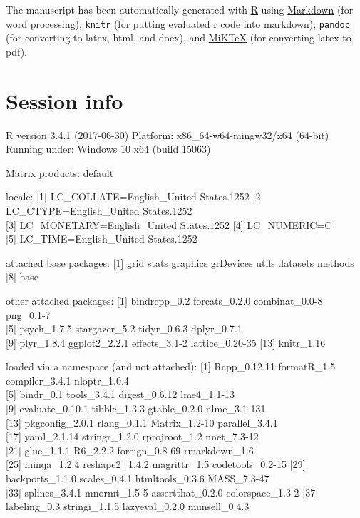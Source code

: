 \documentclass[11pt,,]{article}
\begin{document}
The manuscript has been automatically generated with
\href{http://r-project.org/}{R} using
\href{http://daringfireball.net/projects/markdown/}{Markdown} (for word
processing), \href{http://yihui.name/knitr/}{\texttt{knitr}} (for
putting evaluated r code into markdown),
\href{http://johnmacfarlane.net/pandoc/}{\texttt{pandoc}} (for
converting to latex, html, and docx), and
\href{http://miktex.org/}{MiKTeX} (for converting latex to pdf).

\newpage

\section{Session info}\label{session-info}

R version 3.4.1 (2017-06-30) Platform: x86\_64-w64-mingw32/x64 (64-bit)
Running under: Windows 10 x64 (build 15063)

Matrix products: default

locale: {[}1{]} LC\_COLLATE=English\_United States.1252 {[}2{]}
LC\_CTYPE=English\_United States.1252\\
{[}3{]} LC\_MONETARY=English\_United States.1252 {[}4{]} LC\_NUMERIC=C\\
{[}5{]} LC\_TIME=English\_United States.1252

attached base packages: {[}1{]} grid stats graphics grDevices utils
datasets methods\\
{[}8{]} base

other attached packages: {[}1{]} bindrcpp\_0.2 forcats\_0.2.0
combinat\_0.0-8 png\_0.1-7\\
{[}5{]} psych\_1.7.5 stargazer\_5.2 tidyr\_0.6.3 dplyr\_0.7.1\\
{[}9{]} plyr\_1.8.4 ggplot2\_2.2.1 effects\_3.1-2 lattice\_0.20-35
{[}13{]} knitr\_1.16

loaded via a namespace (and not attached): {[}1{]} Rcpp\_0.12.11
formatR\_1.5 compiler\_3.4.1 nloptr\_1.0.4\\
{[}5{]} bindr\_0.1 tools\_3.4.1 digest\_0.6.12 lme4\_1.1-13\\
{[}9{]} evaluate\_0.10.1 tibble\_1.3.3 gtable\_0.2.0 nlme\_3.1-131\\
{[}13{]} pkgconfig\_2.0.1 rlang\_0.1.1 Matrix\_1.2-10 parallel\_3.4.1\\
{[}17{]} yaml\_2.1.14 stringr\_1.2.0 rprojroot\_1.2 nnet\_7.3-12\\
{[}21{]} glue\_1.1.1 R6\_2.2.2 foreign\_0.8-69 rmarkdown\_1.6\\
{[}25{]} minqa\_1.2.4 reshape2\_1.4.2 magrittr\_1.5 codetools\_0.2-15
{[}29{]} backports\_1.1.0 scales\_0.4.1 htmltools\_0.3.6 MASS\_7.3-47\\
{[}33{]} splines\_3.4.1 mnormt\_1.5-5 assertthat\_0.2.0
colorspace\_1.3-2 {[}37{]} labeling\_0.3 stringi\_1.1.5 lazyeval\_0.2.0
munsell\_0.4.3
\end{document}
